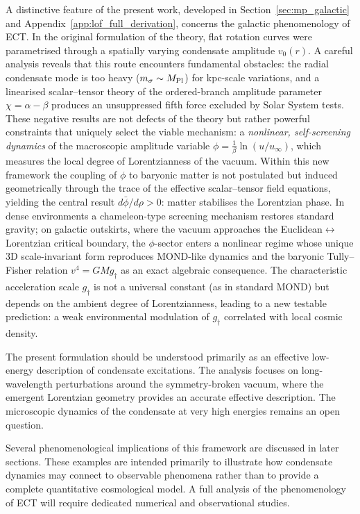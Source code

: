 \documentclass[11pt,a4paper]{article}
\numberwithin{equation}{section}
\begin{document}
A distinctive feature of the present work, developed in
Section~\ref{sec:mp_galactic} and
Appendix~\ref{app:lof_full_derivation}, concerns the
galactic phenomenology of ECT.  In the original formulation
of the theory, flat rotation curves were parametrised through
a spatially varying condensate amplitude $v_0(r)$.  A careful
analysis reveals that this route encounters fundamental
obstacles: the radial condensate mode is too heavy
($m_\sigma \sim M_{\rm Pl}$) for kpc-scale variations, and a
linearised scalar--tensor theory of the ordered-branch
amplitude parameter $\chi = \alpha - \beta$ produces an unsuppressed
fifth force excluded by Solar System tests.
These negative results are not defects of the theory but rather
powerful constraints that uniquely select the viable mechanism:
a \emph{nonlinear, self-screening dynamics} of the
macroscopic amplitude variable $\phi=\frac{1}{\beta}\ln(u/u_\infty)$,
which measures the local degree of Lorentzianness of the
vacuum.
Within this new framework the coupling of $\phi$ to
baryonic matter is not postulated but induced geometrically
through the trace of the effective scalar--tensor field
equations, yielding the central result
$d\bar\phi/d\rho > 0$: matter stabilises the Lorentzian
phase.  In dense environments a chameleon-type screening
mechanism restores standard gravity; on galactic outskirts,
where the vacuum approaches the
Euclidean$\leftrightarrow$Lorentzian critical boundary,
the $\phi$-sector enters a nonlinear regime whose unique
3D scale-invariant form reproduces MOND-like dynamics
and the baryonic Tully--Fisher relation $v^4 = GMg_\dagger$
as an exact algebraic consequence.  The characteristic
acceleration scale $g_\dagger$ is not a universal constant
(as in standard MOND) but depends on the ambient degree of
Lorentzianness, leading to a new testable prediction:
a weak environmental modulation of $g_\dagger$ correlated
with local cosmic density.

The present formulation should be understood primarily as an effective
low-energy description of condensate excitations. The analysis focuses
on long-wavelength perturbations around the symmetry-broken vacuum,
where the emergent Lorentzian geometry provides an accurate effective
description. The microscopic dynamics of the condensate at very high
energies remains an open question.

Several phenomenological implications of this framework are discussed in
later sections. These examples are intended primarily to illustrate how
condensate dynamics may connect to observable phenomena rather than to
provide a complete quantitative cosmological model. A full analysis of
the phenomenology of ECT will require dedicated numerical and
observational studies.
\end{document}
